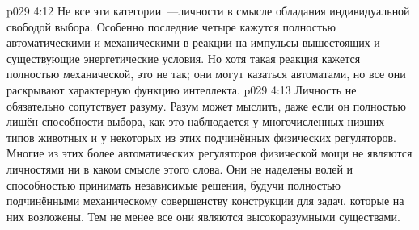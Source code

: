 \vs p029 4:12 \pc Не все эти категории~---личности в смысле обладания индивидуальной свободой выбора. Особенно последние четыре кажутся полностью автоматическими и механическими в реакции на импульсы вышестоящих и существующие энергетические условия. Но хотя такая реакция кажется полностью механической, это не так; они могут казаться автоматами, но все они раскрывают характерную функцию интеллекта.
\vs p029 4:13 Личность не обязательно сопутствует разуму. Разум может мыслить, даже если он полностью лишён способности выбора, как это наблюдается у многочисленных низших типов животных и у некоторых из этих подчинённых физических регуляторов. Многие из этих более автоматических регуляторов физической мощи не являются личностями ни в каком смысле этого слова. Они не наделены волей и способностью принимать независимые решения, будучи полностью подчинёнными механическому совершенству конструкции для задач, которые на них возложены. Тем не менее все они являются высокоразумными существами.
